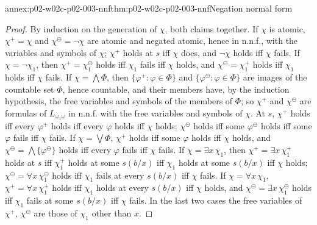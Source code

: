 \begin{annexitem}{annex:p02-w02c-p02-003-nnf}{thm:p02-w02c-p02-003-nnf}{Negation normal form}
\begin{proof}
By induction on the generation of \(\chi\), both claims together.  If
\(\chi\) is atomic, \(\chi^{+}=\chi\) and \(\chi^{\ominus}=\neg\chi\) are
atomic and negated atomic, hence in n.n.f., with the variables and symbols
of \(\chi\); \(\chi^{+}\) holds at \(s\) iff \(\chi\) does, and
\(\neg\chi\) holds iff \(\chi\) fails.  If \(\chi=\neg\chi_1\), then
\(\chi^{+}=\chi_1^{\ominus}\) holds iff \(\chi_1\) fails iff \(\chi\)
holds, and \(\chi^{\ominus}=\chi_1^{+}\) holds iff \(\chi_1\) holds iff
\(\chi\) fails.  If \(\chi=\bigwedge\Phi\), then
\(\{\varphi^{+}:\varphi\in\Phi\}\) and
\(\{\varphi^{\ominus}:\varphi\in\Phi\}\) are images of the countable set
\(\Phi\), hence countable, and their members have, by the induction
hypothesis, the free variables and symbols of the members of \(\Phi\); so
\(\chi^{+}\) and \(\chi^{\ominus}\) are formulas of \(L_{\omega_1\omega}\)
in n.n.f. with the free variables and symbols of \(\chi\).  At \(s\),
\(\chi^{+}\) holds iff every \(\varphi^{+}\) holds iff every \(\varphi\)
holds iff \(\chi\) holds; \(\chi^{\ominus}\) holds iff some
\(\varphi^{\ominus}\) holds iff some \(\varphi\) fails iff \(\chi\) fails.
If \(\chi=\bigvee\Phi\), \(\chi^{+}\) holds iff some \(\varphi\) holds iff
\(\chi\) holds, and \(\chi^{\ominus}=\bigwedge\{\varphi^{\ominus}\}\) holds
iff every \(\varphi\) fails iff \(\chi\) fails.  If \(\chi=\exists
x\,\chi_1\), then \(\chi^{+}=\exists x\,\chi_1^{+}\) holds at \(s\) iff
\(\chi_1^{+}\) holds at some \(s(b/x)\) iff \(\chi_1\) holds at some
\(s(b/x)\) iff \(\chi\) holds; \(\chi^{\ominus}=\forall x\,\chi_1^{\ominus}\)
holds iff \(\chi_1\) fails at every \(s(b/x)\) iff \(\chi\) fails.  If
\(\chi=\forall x\,\chi_1\), \(\chi^{+}=\forall x\,\chi_1^{+}\) holds iff
\(\chi_1\) holds at every \(s(b/x)\) iff \(\chi\) holds, and
\(\chi^{\ominus}=\exists x\,\chi_1^{\ominus}\) holds iff \(\chi_1\) fails
at some \(s(b/x)\) iff \(\chi\) fails.  In the last two cases the free
variables of \(\chi^{+}\), \(\chi^{\ominus}\) are those of \(\chi_1\) other
than \(x\).
\end{proof}
\end{annexitem}

